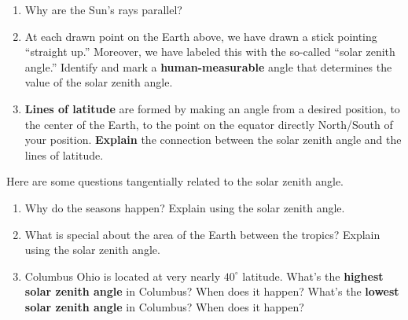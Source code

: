 \documentclass[noauthor,nooutcomes,handout,hints,12pt]{ximera}
\begin{document}
\begin{question}
\begin{center}
  \end{center}
  \begin{enumerate}
  \item Why are the Sun's rays parallel?
  \item At each drawn point on the Earth above, we have drawn a stick
    pointing ``straight up.'' Moreover, we have labeled this with the
    so-called ``solar zenith angle.'' Identify and mark a \textbf{human-measurable}
    angle that determines the value of the solar zenith angle.
  \item \textbf{Lines of latitude} are formed by making an angle from
    a desired position, to the center of the Earth, to the point on
    the equator directly North/South of your position. \textbf{Explain}
    the connection between the solar zenith angle and the lines of latitude.
  \end{enumerate}
 
\end{question}
\mynewpage




\begin{question}
  Here are some questions tangentially related to the solar zenith angle.
  \begin{enumerate}
  \item Why do the seasons happen? Explain using the solar zenith angle.
  \item What is special about the area of the Earth between the tropics? Explain using the solar zenith angle.
  \item Columbus Ohio is located at very nearly $40^\circ$
    latitude. What's the \textbf{highest solar zenith angle} in
    Columbus? When does it happen? What's the \textbf{lowest
      solar zenith angle} in Columbus? When does it happen?
  \end{enumerate}
\end{question}
\end{document}
